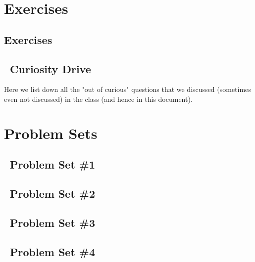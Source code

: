 \documentclass[11pt]{report}
\begin{document}
\chapter{Exercises}
\section{Exercises}
\setcounter{excount}{0}

\newpage

\section{~Curiosity Drive}
Here we list down all the "out of curious" questions that we discussed (sometimes even not discussed) in the class (and hence in this document).

\def\psetbackref{0}

\chapter{Problem Sets}

\section{~Problem Set \#1}
\begin{enumerate}[(1)]
\end{enumerate}

\newpage
\section{~Problem Set \#2}

\begin{enumerate}[(1)]
\end{enumerate}

\newpage
\section{~Problem Set \#3}

\begin{enumerate}[(1)]
\end{enumerate}

\newpage
\section{~Problem Set \#4}

\begin{enumerate}[(1)]
\end{enumerate}



\end{document}
